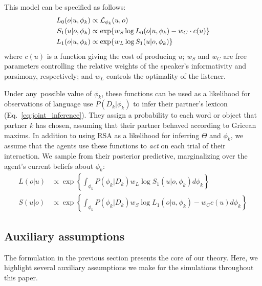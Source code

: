 This model can be specified as follows:
\begin{align}
L_0(o | u, \phi_k) &\propto  \mathcal{L}_{\phi_k}(u,o)\hfill\label{eq:RSA}\\
S_1(u | o, \phi_k) &\propto   \exp\{w_S \log L_0(o | u, \phi_k) - w_C \cdot c(u)\}\nonumber   \\
L_1(o | u, \phi_k) &\propto   \exp\{w_L \log S_1(u | o, \phi_k)\}\nonumber
\end{align}
where $c(u)$ is a function giving the cost of producing $u$; $w_S$ and $w_C$ are free parameters controlling the relative weights of the speaker's informativity and parsimony, respectively; and $w_L$ controls the optimality of the listener.

Under any possible value of $\phi_k$, these functions can be used as a likelihood for observations of language use $P(D_k | \phi_k)$ to infer their partner's lexicon (Eq.~\ref{eq:joint_inference}).
They assign a probability to each word or object that partner $k$ has chosen, assuming that their partner behaved according to Gricean maxims.
In addition to using RSA as a likelihood for inferring $\Theta$ and $\phi_k$, we assume that the agents use these functions to \emph{act} on each trial of their interaction.
We sample from their posterior predictive, marginalizing over the agent's current beliefs about $\phi_k$:
\begin{align}
L(o|u) &\propto   \exp\left\{ \textstyle{\int_{\phi_k}} P(\phi_k | D_k) w_L \log S_1(u|o, \phi_k)d\phi_k\right\}\label{eq:marginalized}\\
S(u|o) &\propto  \exp\left\{ \textstyle{\int_{\phi_k}} P(\phi_k | D_k)  w_S \log L_1(o| u, \phi_k) - w_C c(u)d\phi_k\right\}\nonumber
\end{align}

\subsection{Auxiliary assumptions}

The formulation in the previous section presents the core of our theory.
Here, we highlight several auxiliary assumptions we make for the simulations throughout this paper.

